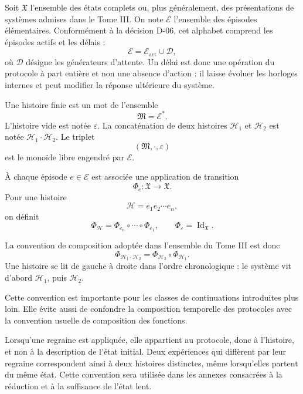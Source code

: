 Soit \(\mathfrak X\) l'ensemble des états complets ou, plus
généralement, des présentations de systèmes admises dans le Tome III.
On note \(\mathcal E\) l'ensemble des épisodes élémentaires. Conformément
à la décision D-06, cet alphabet comprend les épisodes actifs et les
délais :
\[
\mathcal E=\mathcal E_{\mathrm{act}}\cup\mathcal D,
\]
où \(\mathcal D\) désigne les générateurs d'attente. Un délai est donc
une opération du protocole à part entière et non une absence d'action :
il laisse évoluer les horloges internes et peut modifier la réponse
ultérieure du système.

Une histoire finie est un mot de l'ensemble
\[
\mathfrak M=\mathcal E^{\ast}.
\]
L'histoire vide est notée \(\varepsilon\). La concaténation de deux
histoires \(\mathcal H_1\) et \(\mathcal H_2\) est notée
\(\mathcal H_1\cdot\mathcal H_2\). Le triplet
\[
(\mathfrak M,\cdot,\varepsilon)
\]
est le monoïde libre engendré par \(\mathcal E\).

À chaque épisode \(e\in\mathcal E\) est associée une application de
transition
\[
\Phi_e:\mathfrak X\longrightarrow\mathfrak X.
\]
Pour une histoire
\[
\mathcal H=e_1e_2\cdots e_n,
\]
on définit
\[
\Phi_{\mathcal H}
=
\Phi_{e_n}\circ\cdots\circ\Phi_{e_1},
\qquad
\Phi_{\varepsilon}=\operatorname{Id}_{\mathfrak X}.
\]

La convention de composition adoptée dans l'ensemble du Tome III est
donc
\begin{equation}
\label{eq:annexe-G-composition}
\boxed{
\Phi_{\mathcal H_1\cdot\mathcal H_2}
=
\Phi_{\mathcal H_2}\circ\Phi_{\mathcal H_1}.
}
\end{equation}
Une histoire se lit de gauche à droite dans l'ordre chronologique : le
système vit d'abord \(\mathcal H_1\), puis \(\mathcal H_2\).

Cette convention est importante pour les classes de continuations
introduites plus loin. Elle évite aussi de confondre la composition
temporelle des protocoles avec la convention usuelle de composition des
fonctions.

\begin{encadre}[title={A-H1 --- statut de la regraine}]
Lorsqu'une regraine est appliquée, elle appartient au protocole, donc à
l'histoire, et non à la description de l'état initial. Deux expériences
qui diffèrent par leur regraine correspondent ainsi à deux histoires
distinctes, même lorsqu'elles partent du même état. Cette convention sera
utilisée dans les annexes consacrées à la réduction et à la suffisance de
l'état lent.
\end{encadre}

